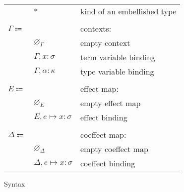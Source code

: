 \documentclass[12pt]{article}
\newcommand\anno[2]{#1 : #2}
\newcommand\evar{x}
\newcommand\embellished{\sigma}
\newcommand\tvar{\alpha}
\newcommand\kind{\kappa}
\newcommand\ktembellished{\ast}
\newcommand\context{\Gamma}
\newcommand\cempty{\varnothing_{\context}}
\newcommand\cextend[2]{#1, #2}
\newcommand\effect{e}
\newcommand\effectmap{E}
\newcommand\coeffectmap{\Delta}
\newcommand\emempty{\varnothing_{\effectmap}}
\newcommand\ecomempty{\varnothing_{\coeffectmap}}
\newcommand\emmap[2]{#1 \mapsto #2}
\newcommand\emextend[2]{#1, #2}
\begin{document}
\begin{figure}
\begin{mdframed}[backgroundcolor=none]
\begin{center}
\begin{tabular}{l l l}
          & $\ktembellished$ & kind of an embellished type \\
          \\
          $\context \Coloneqq$ & & contexts: \\
          & $\cempty$ & empty context \\
          & $\cextend{\context}{\anno{\evar}{\embellished}}$ & term variable binding \\
          & $\cextend{\context}{\anno{\tvar}{\kind}}$ & type variable binding \\
          \\
          $\effectmap \Coloneqq$ & & effect map: \\
          & $\emempty$ & empty effect map \\
          & $\emextend{\effectmap}{\emmap{\effect}{\anno{\evar}{\embellished}}}$ & effect binding \\
          \\
          $\coeffectmap \Coloneqq$ & & coeffect map: \\
          & $\ecomempty$ & empty coeffect map \\
          & $\emextend{\coeffectmap}{\emmap{\effect}{\anno{\evar}{\embellished}}}$ & coeffect binding \\
        \end{tabular}
      \end{center}

      \caption{Syntax}\label{fig:syntax}
    \end{mdframed}
  \end{figure}
\end{document}
